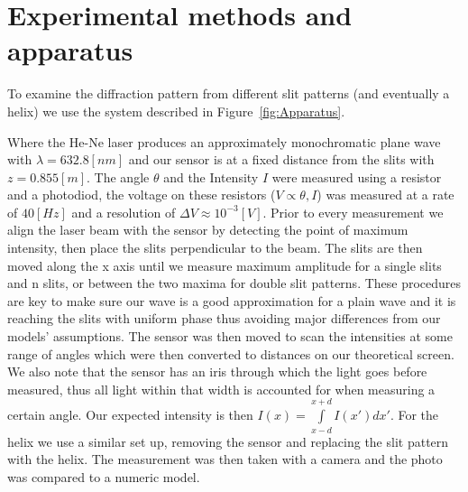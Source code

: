 \section{Experimental methods and apparatus}\label{sec:experimental-technique-and-apparatus}
To examine the diffraction pattern from different slit patterns (and eventually a helix) we use the system described in Figure~\ref{fig:Apparatus}.

Where the He-Ne laser produces an approximately monochromatic plane wave with $\lambda=632.8 [nm]$ and our sensor is at a fixed distance from the slits with $z=0.855 [m]$.
The angle $\theta$ and the Intensity $I$ were measured using a resistor and a photodiod, the voltage on these resistors ($V\propto\theta,I$) was
measured at a rate of $40[Hz]$ and a resolution of $\Delta V\approx10^{-3}[V]$.
Prior to every measurement we align the laser beam with the sensor by detecting the point of maximum intensity, then place the slits perpendicular to
the beam.
The slits are then moved along the x axis until we measure maximum amplitude for a single slits and n slits, or between the two maxima for double slit patterns.
These procedures are key to make sure our wave is a good approximation for a plain wave and it is reaching the slits with uniform phase thus avoiding major differences from our models' assumptions.
The sensor was then moved to scan the intensities at some range of angles which were then converted to distances on our theoretical screen.
We also note that the sensor has an iris through which the light goes before measured, thus all light within that width is accounted for when measuring a
certain angle.
Our expected intensity is then $I(x)=\int\limits_{x-d}^{x+d}I(x')dx'$.
For the helix we use a similar set up, removing the sensor and replacing the slit pattern with the helix.
The measurement was then taken with a camera and the photo was compared to a numeric model.